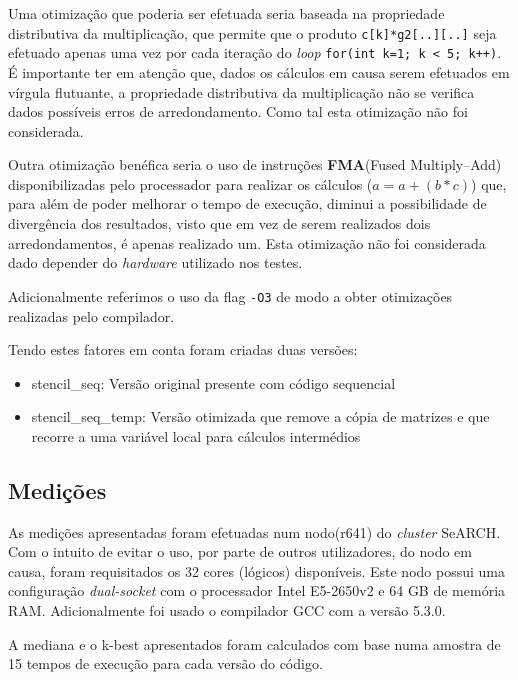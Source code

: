 \documentclass{article}
\begin{document}
Uma otimização que poderia ser efetuada seria baseada na propriedade distributiva da multiplicação, que permite que o produto \texttt{c[k]*g2[..][..]} seja efetuado apenas
uma vez por cada iteração do \textit{loop} \texttt{for(int k=1; k < 5; k++)}. É importante ter em atenção que, dados os cálculos em causa serem efetuados em
vírgula flutuante, a propriedade distributiva da multiplicação não se verifica dados possíveis erros de arredondamento. Como tal esta otimização não foi considerada.

Outra otimização benéfica seria o uso de instruções \textbf{FMA}(Fused Multiply–Add) disponibilizadas pelo processador para realizar os cálculos ($a = a + (b*c)$) que, para além de poder melhorar o tempo de execução, diminui a possibilidade de divergência dos resultados, visto que em vez de serem realizados dois arredondamentos, é apenas realizado um. Esta otimização não foi considerada dado depender do \textit{hardware} utilizado nos testes.

Adicionalmente referimos o uso da flag \texttt{-O3} de modo a obter otimizações realizadas pelo compilador.

Tendo estes fatores em conta foram criadas duas versões:
\begin{itemize}
    \item stencil\_seq: Versão original presente com código sequencial
    \item stencil\_seq\_temp: Versão otimizada que remove a cópia de matrizes e  que recorre a uma variável local para cálculos intermédios
\end{itemize}

\subsection{Medições}
As medições apresentadas foram efetuadas num nodo(r641) do \textit{cluster} SeARCH. Com o intuito de evitar o uso, por parte de outros utilizadores, do nodo em causa, foram requisitados os 32 cores (lógicos) disponíveis. 
Este nodo possui uma configuração \textit{dual-socket} com o processador Intel E5-2650v2 e 64 GB de memória RAM. Adicionalmente foi usado o compilador GCC com a versão 5.3.0.

A mediana e o k-best apresentados foram calculados com base numa amostra de 15 tempos de execução para cada versão do código.
\end{document}
